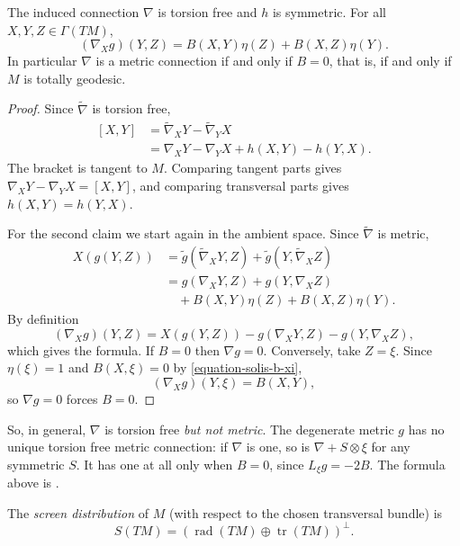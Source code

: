 \begin{proposition}
\label{proposition-solis-induced-connection}
The induced connection $\nabla$ is torsion
free and $h$ is symmetric. For all
$X,Y,Z\in\Gamma(TM)$,
$$
(\nabla_Xg)(Y,Z)
=B(X,Y)\eta(Z)+B(X,Z)\eta(Y).
$$
In particular $\nabla$ is a metric
connection if and only if $B=0$, that is,
if and only if $M$ is totally geodesic.
\end{proposition}

\begin{proof}
Since $\widetilde{\nabla}$ is torsion
free,
$$
\begin{aligned}
[X,Y]
&=\widetilde{\nabla}_XY
-\widetilde{\nabla}_YX\\
&=\nabla_XY-\nabla_YX
+h(X,Y)-h(Y,X).
\end{aligned}
$$
The bracket is tangent to $M$. Comparing
tangent parts gives
$\nabla_XY-\nabla_YX=[X,Y]$, and comparing
transversal parts gives $h(X,Y)=h(Y,X)$.

For the second claim we start again in
the ambient space. Since
$\widetilde{\nabla}$ is metric,
$$
\begin{aligned}
X\left(g(Y,Z)\right)
&=\widetilde{g}(\widetilde{\nabla}_XY,Z)
+\widetilde{g}(Y,\widetilde{\nabla}_XZ)\\
&=g(\nabla_XY,Z)+g(Y,\nabla_XZ)\\
&\quad+B(X,Y)\eta(Z)+B(X,Z)\eta(Y).
\end{aligned}
$$
By definition
$$
(\nabla_Xg)(Y,Z)=X\left(g(Y,Z)\right)
-g(\nabla_XY,Z)-g(Y,\nabla_XZ),
$$
which gives the formula. If $B=0$ then
$\nabla g=0$. Conversely, take $Z=\xi$.
Since $\eta(\xi)=1$ and
$B(X,\xi)=0$ by
\eqref{equation-solis-b-xi},
$$
(\nabla_Xg)(Y,\xi)=B(X,Y),
$$
so $\nabla g=0$ forces $B=0$.
\end{proof}

\noindent
So, in general, $\nabla$ is torsion free
\emph{but not metric}. The degenerate
metric $g$ has no unique torsion free
metric connection: if $\nabla$ is one, so
is $\nabla+S\otimes\xi$ for any symmetric
$S$. It has one at all only when $B=0$,
since $L_\xi g=-2B$. The formula above is
\cite[Proposition 2.1(5)]{navarro2020screen}.

\begin{definition}
\label{definition-solis-screen}
The \emph{screen distribution} of $M$
(with respect to the chosen transversal
bundle) is
$$
S(TM)=\left(\operatorname{rad}(TM)
\oplus\operatorname{tr}(TM)
\right)^{\perp}.
$$
\end{definition}

